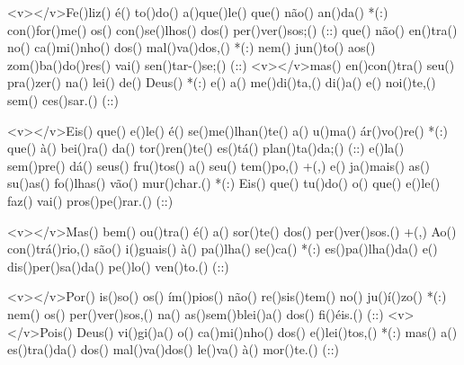 <v></v>Fe()liz() é() to()do() a()que()le() que() não() an()da() *(:)
con()for()me() os() con()se()lhos() dos() per()ver()sos;() (::)
que() não() en()tra() no() ca()mi()nho() dos() mal()va()dos,() *(:)
nem() jun()to() aos() zom()ba()do()res() vai() sen()tar-()se;() (::)
<v></v>mas() en()con()tra() seu() pra()zer() na() lei() de() Deus() *(:)
e() a() me()di()ta,() di()a() e() noi()te,() sem() ces()sar.() (::)

<v></v>Eis() que() e()le() é() se()me()lhan()te() a() u()ma() ár()vo()re() *(:)
que() à() bei()ra() da() tor()ren()te() es()tá() plan()ta()da;() (::)
e()la() sem()pre() dá() seus() fru()tos() a() seu() tem()po,() +(,)
e() ja()mais() as() su()as() fo()lhas() vão() mur()char.() *(:)
Eis() que() tu()do() o() que() e()le() faz() vai() pros()pe()rar.() (::)

<v></v>Mas() bem() ou()tra() é() a() sor()te() dos() per()ver()sos.() +(,)
Ao() con()trá()rio,() são() i()guais() à() pa()lha() se()ca() *(:)
es()pa()lha()da() e() dis()per()sa()da() pe()lo() ven()to.() (::)

<v></v>Por() is()so() os() ím()pios() não() re()sis()tem() no() ju()í()zo() *(:)
nem() os() per()ver()sos,() na() as()sem()blei()a() dos() fi()éis.() (::)
<v></v>Pois() Deus() vi()gi()a() o() ca()mi()nho() dos() e()lei()tos,() *(:)
mas() a() es()tra()da() dos() mal()va()dos() le()va() à() mor()te.() (::)